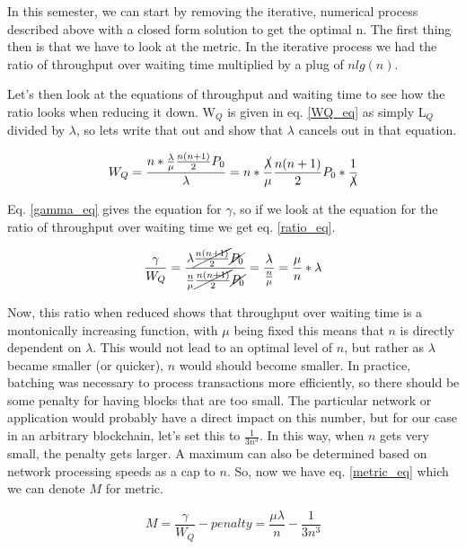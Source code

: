 \documentclass[conference]{IEEEtran}
\begin{document}
In this semester, we can start by removing the iterative, numerical process described above with 
a closed form solution to get the optimal n. The first thing then is that we have to look at the metric.
In the iterative process we had the ratio of throughput over waiting time multiplied by a plug of $n lg(n)$. 

Let's then look at the equations of throughput and waiting time to see how the ratio looks when reducing it 
down. W$_Q$ is given in eq. \ref{WQ_eq} as simply L$_Q$ divided by $\lambda$, so lets write that out and 
show that $\lambda$ cancels out in that equation.

\begin{equation}
W_Q=\frac{n\ast\frac{\lambda}{\mu}\frac{n(n+1)}{2}P_0}{\lambda}=n\ast\frac{\cancel{\lambda}}{\mu}\frac{n(n+1)}{2}P_0\ast\frac{1}{\cancel{\lambda}}\label{WQ_reduced}
\end{equation}

Eq. \ref{gamma_eq} gives the equation for $\gamma$, so if we look at the equation for the ratio of throughput over waiting time we get eq. \ref{ratio_eq}. 

\begin{equation}
\frac{\gamma}{W_Q}=\frac{\lambda\cancel{\frac{n(n+1)}{2}}\cancel{P_0}}{\frac{n}{\mu}\cancel{\frac{n(n+1)}{2}}\cancel{P_0}}=\frac{\lambda}{\frac{n}{\mu}}=\frac{\mu}{n}\ast\lambda\label{ratio_eq}
\end{equation}

Now, this ratio when reduced shows that throughput over waiting time is a montonically increasing function, 
with $\mu$ being fixed this means that $n$ is directly dependent on $\lambda$. This would not lead to an optimal 
level of $n$, but rather as $\lambda$ became smaller (or quicker), $n$ would should become smaller. In practice, 
batching was necessary to process transactions more efficiently, so there should be some penalty for having blocks 
that are too small. The particular network or application would probably have a direct impact on this number, but
for our case in an arbitrary blockchain, let's set this to $\frac{1}{3n^3}$. In this way, when $n$ gets very small, 
the penalty gets larger. A maximum can also be determined based on network processing speeds as a cap to 
$n$. So, now we have eq. \ref{metric_eq} which we can denote $M$ for metric.

\begin{equation}
M=\frac{\gamma}{W_Q}-penalty=\frac{\mu\lambda}{n}-\frac{1}{3n^3}\label{metric_eq}
\end{equation}
\end{document}
